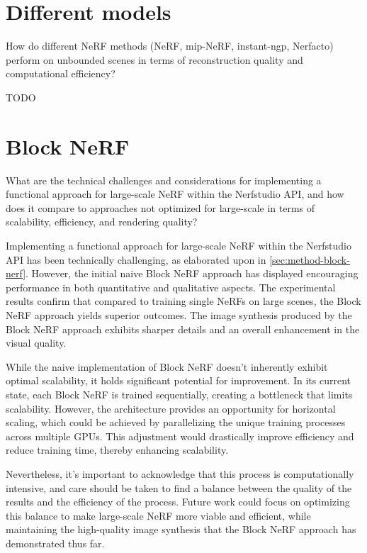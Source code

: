 \section{Different models}
\begin{description}[leftmargin=!,labelwidth=\widthof{RQ 1:}]
\item[\textbf{RQ 3:}] How do different NeRF methods (NeRF, mip-NeRF, instant-ngp, Nerfacto) perform on unbounded scenes in terms of reconstruction quality and computational efficiency?
\end{description}
TODO





\section{Block NeRF}
\begin{description}[leftmargin=!,labelwidth=\widthof{RQ 1:}]
\item[\textbf{RQ 4:}] What are the technical challenges and considerations for implementing a functional approach for large-scale NeRF within the Nerfstudio API, and how does it compare to approaches not optimized for large-scale in terms of scalability, efficiency, and rendering quality?
\end{description}

Implementing a functional approach for large-scale NeRF within the Nerfstudio API has been technically challenging, as elaborated upon in \autoref{sec:method-block-nerf}. However, the initial naive Block NeRF approach has displayed encouraging performance in both quantitative and qualitative aspects. The experimental results confirm that compared to training single NeRFs on large scenes, the Block NeRF approach yields superior outcomes. The image synthesis produced by the Block NeRF approach exhibits sharper details and an overall enhancement in the visual quality.

While the naive implementation of Block NeRF doesn't inherently exhibit optimal scalability, it holds significant potential for improvement. In its current state, each Block NeRF is trained sequentially, creating a bottleneck that limits scalability. However, the architecture provides an opportunity for horizontal scaling, which could be achieved by parallelizing the unique training processes across multiple GPUs. This adjustment would drastically improve efficiency and reduce training time, thereby enhancing scalability.

Nevertheless, it's important to acknowledge that this process is computationally intensive, and care should be taken to find a balance between the quality of the results and the efficiency of the process. Future work could focus on optimizing this balance to make large-scale NeRF more viable and efficient, while maintaining the high-quality image synthesis that the Block NeRF approach has demonstrated thus far.





